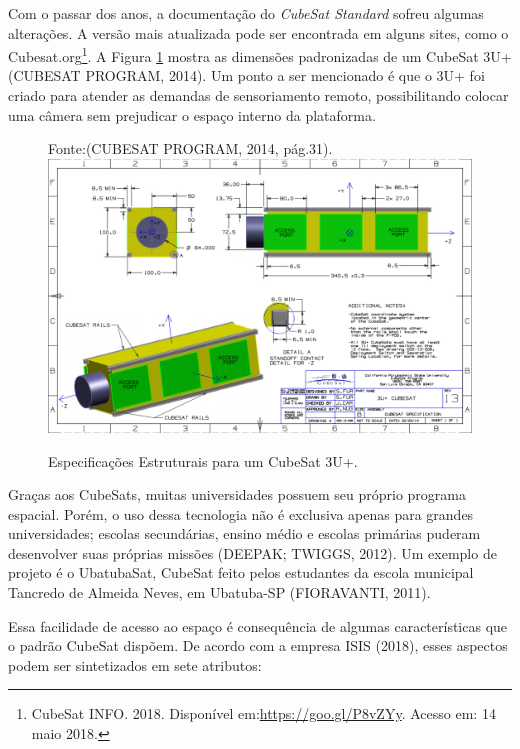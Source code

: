 Com o passar dos anos, a documentação do \textit{CubeSat Standard} sofreu algumas alterações. A versão mais atualizada pode ser encontrada em alguns sites, como o Cubesat.org\footnote{CubeSat INFO. 2018. Disponível em:\url{https://goo.gl/P8vZYy}. Acesso em: 14 maio 2018.}. A Figura \ref{fig05} mostra as dimensões padronizadas de um CubeSat 3U+ (CUBESAT PROGRAM, 2014). Um ponto a ser mencionado é que o 3U+ foi criado para atender as demandas de sensoriamento remoto, possibilitando colocar uma câmera sem prejudicar o espaço interno da plataforma.

{\small
	\begin{figure}[h]
		\centering
		Fonte:(CUBESAT PROGRAM, 2014, pág.31).
		\includegraphics[keepaspectratio=true,scale=0.55]{figuras/cubesat3u+.PNG}
		\caption{Especificações Estruturais para um CubeSat 3U+.}		
		\label{fig05}
	\end{figure}
}

Graças aos CubeSats, muitas universidades possuem seu próprio programa espacial. Porém, o uso dessa tecnologia não é exclusiva apenas para grandes universidades; escolas secundárias, ensino médio e escolas primárias puderam desenvolver suas próprias missões (DEEPAK; TWIGGS, 2012). Um exemplo de projeto é o UbatubaSat, CubeSat feito pelos estudantes da escola municipal Tancredo de Almeida Neves, em Ubatuba-SP (FIORAVANTI, 2011).

Essa facilidade de acesso ao espaço é consequência de algumas características que o padrão CubeSat dispõem. De acordo com a empresa ISIS (2018), esses aspectos podem ser sintetizados em sete atributos:

